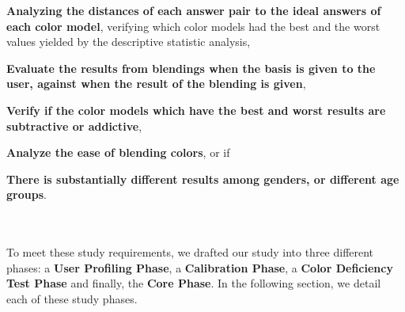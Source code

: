 \begin{enumerate*}
		\item \textbf{Analyzing the distances of each answer pair to the ideal answers of each color model}, verifying
		which color models had the best and the worst values yielded by the descriptive statistic analysis,
		\item \textbf{Evaluate the results from blendings when the basis is given to the user, against when the result
		of the blending is given},
		\item \textbf{Verify if the color models which have the best and worst results are subtractive or addictive},
		\item \textbf{Analyze the ease of blending colors}, or if
		\item \textbf{There is substantially different results among genders, or different age groups}.
\end{enumerate*}
\\ \\
%
To meet these study requirements, we drafted our study into three different phases: a \textbf{User Profiling Phase},
a \textbf{Calibration Phase}, a \textbf{Color Deficiency Test Phase} and finally, the \textbf{Core Phase}. In the
following section, we detail each of these study phases. \par
%
